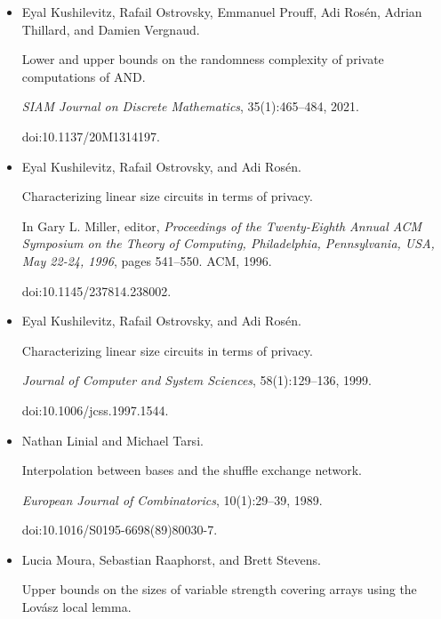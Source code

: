 \begin{itemize}
\item[] 
[13]

Eyal Kushilevitz, Rafail Ostrovsky, Emmanuel Prouff, Adi Rosén, Adrian
Thillard, and Damien Vergnaud.


Lower and upper bounds on the randomness complexity of private
computations of AND.


\emph{SIAM Journal on Discrete Mathematics}, 35(1):465–484, 2021.


doi:10.1137/20M1314197.





\item[] 
[14]

Eyal Kushilevitz, Rafail Ostrovsky, and Adi Rosén.


Characterizing linear size circuits in terms of privacy.


In Gary L. Miller, editor, \emph{Proceedings of the Twenty-Eighth
Annual ACM Symposium on the Theory of Computing, Philadelphia,
Pennsylvania, USA, May 22-24, 1996}, pages 541–550. ACM, 1996.


doi:10.1145/237814.238002.





\item[] 
[15]

Eyal Kushilevitz, Rafail Ostrovsky, and Adi Rosén.


Characterizing linear size circuits in terms of privacy.


\emph{Journal of Computer and System Sciences}, 58(1):129–136, 1999.


doi:10.1006/jcss.1997.1544.





\item[] 
[16]

Nathan Linial and Michael Tarsi.


Interpolation between bases and the shuffle exchange network.


\emph{European Journal of Combinatorics}, 10(1):29–39, 1989.


doi:10.1016/S0195-6698(89)80030-7.





\item[] 
[17]

Lucia Moura, Sebastian Raaphorst, and Brett Stevens.


Upper bounds on the sizes of variable strength covering arrays using
the Lovász local lemma.



\end{itemize}
